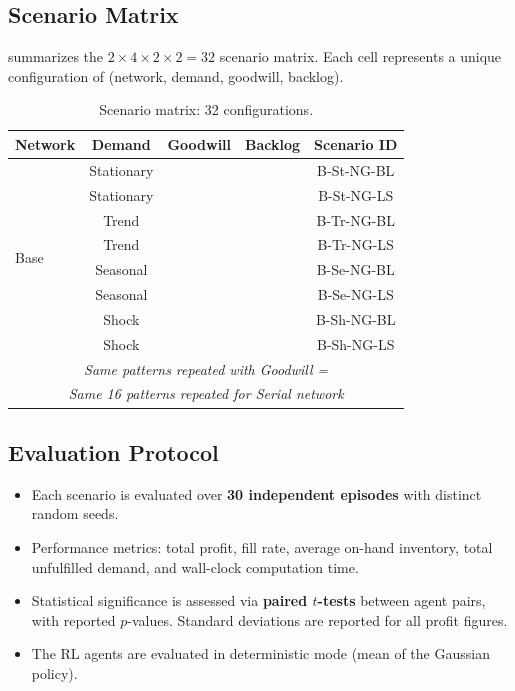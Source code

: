 \documentclass[preprint,12pt]{elsarticle}
\newcommand{\cmark}{\ding{51}}
\newcommand{\xmark}{\ding{55}}
\begin{document}
\subsection{Scenario Matrix}

 summarizes the $2 \times 4 \times 2 \times 2 = 32$
scenario matrix. Each cell represents a unique configuration of
(network, demand, goodwill, backlog).

\begin{table}[htbp]
\centering
\caption{Scenario matrix: 32 configurations.}
\label{tab:scenarios}
\begin{tabular}{lcccc}
\toprule
\textbf{Network} & \textbf{Demand} & \textbf{Goodwill} & \textbf{Backlog}
                  & \textbf{Scenario ID} \\
\midrule
\multirow{8}{*}{Base}   & Stationary & \xmark & \cmark & B-St-NG-BL \\
                         & Stationary & \xmark & \xmark & B-St-NG-LS \\
                         & Trend      & \xmark & \cmark & B-Tr-NG-BL \\
                         & Trend      & \xmark & \xmark & B-Tr-NG-LS \\
                         & Seasonal   & \xmark & \cmark & B-Se-NG-BL \\
                         & Seasonal   & \xmark & \xmark & B-Se-NG-LS \\
                         & Shock      & \xmark & \cmark & B-Sh-NG-BL \\
                         & Shock      & \xmark & \xmark & B-Sh-NG-LS \\
\midrule
\multicolumn{5}{c}{\emph{Same patterns repeated with Goodwill = \cmark}} \\
\midrule
\multicolumn{5}{c}{\emph{Same 16 patterns repeated for Serial network}} \\
\bottomrule
\end{tabular}
\end{table}

\subsection{Evaluation Protocol}

\begin{itemize}
  \item Each scenario is evaluated over \textbf{30 independent episodes}
        with distinct random seeds.
  \item Performance metrics: total profit, fill rate, average on-hand
        inventory, total unfulfilled demand, and wall-clock computation
        time.
  \item Statistical significance is assessed via \textbf{paired $t$-tests}
        between agent pairs, with reported $p$-values. Standard deviations
        are reported for all profit figures.
  \item The RL agents are evaluated in deterministic mode
        (mean of the Gaussian policy).
\end{itemize}
\end{document}
